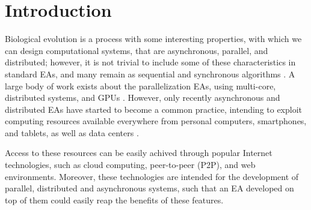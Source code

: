 \documentclass[conference]{IEEEtran}
\begin{document}
\section{Introduction}

Biological evolution is a process with some interesting properties,
with which we can design computational systems, that are asynchronous,
parallel, and distributed;
however, it is not trivial to include some of these characteristics in standard
EAs, and many remain as sequential and synchronous algorithms \cite{eiben}.
A large body of work exists about the parallelization EAs, using multi-core, 
distributed systems, and GPUs \cite{cantu2000efficient,hofmann2013performance}.
However, only recently asynchronous and distributed EAs have started to become
a common practice, intending to exploit computing resources available everywhere
from personal computers, smartphones, and tablets, as well as data 
centers \cite{agajaj,FlexGP}. 

Access to these resources can be easily achived through popular Internet 
technologies, such as cloud computing, peer-to-peer (P2P), and web environments. 
Moreover, these technologies are intended for the
development of parallel, distributed and asynchronous systems, such
that an EA developed on top of them could easily reap the benefits of
these features.
\end{document}
